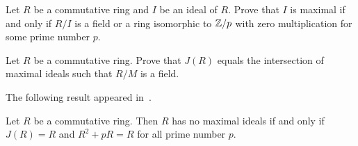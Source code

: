 \begin{exercise}
\label{xca:R/I_field_or_zero}
    Let $R$ be a commutative ring 
    and $I$ be an ideal of $R$. Prove that
    $I$ is maximal if and only if $R/I$ is a field
    or a ring isomorphic to 
    $\mathbb{Z}/p$ with zero multiplication for some prime number $p$. 
\end{exercise}

\begin{exercise}
    \label{xca:J(R)_fields}
    Let $R$ be a commutative ring. Prove that
    $J(R)$ equals the intersection of maximal ideals 
    such that $R/M$ is a field. 
\end{exercise}

The following result appeared in~\cite{MR0424776}.




\begin{theorem}[Henriksen]
\label{thm:Henriksen}
Let $R$ be a commutative ring. Then $R$ has
no maximal ideals if and only if 
$J(R)=R$ and $R^2+pR=R$ for all prime number $p$. 
\end{theorem}

